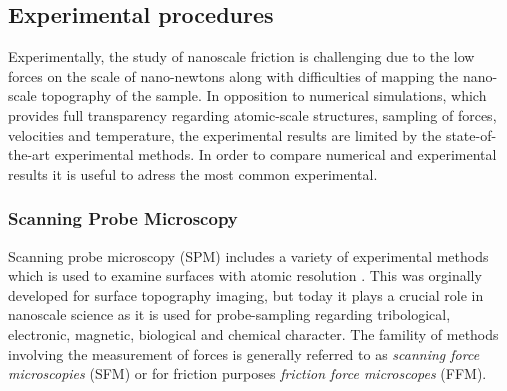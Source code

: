 



\subsection{Experimental procedures}

Experimentally, the study of nanoscale friction is challenging due to the low
forces on the scale of nano-newtons along with difficulties of mapping the
nano-scale topography of the sample. In opposition to numerical simulations, which provides full
transparency regarding atomic-scale structures, sampling of forces, velocities
and temperature, the experimental results are limited by the state-of-the-art
experimental methods. In order to compare numerical and experimental results it is useful to adress the most common experimental.

\subsubsection{Scanning Probe Microscopy}\label{sec:SPM} Scanning probe
microscopy (\acrshort{SPM}) includes a variety of experimental methods which is used to
examine surfaces with atomic resolution \cite[pp. 6-27]{BHUSHAN20051507}. This was
orginally developed for surface topography imaging, but today it plays a crucial
role in nanoscale science as it is used for probe-sampling regarding
tribological, electronic, magnetic, biological and chemical character. The
famility of methods involving the measurement of forces is generally referred to
as \textit{scanning force microscopies} (\acrshort{SFM}) or for friction purposes
\textit{friction force microscopes} (\acrshort{FFM}).

